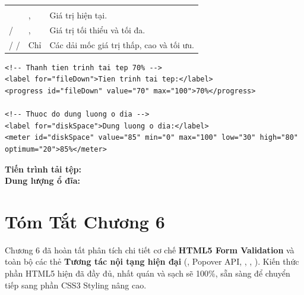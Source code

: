 \begin{prettyTableBox}
\begin{tabularx}{\linewidth}{K{3.0cm} Z Z}
 &  &  \\
 & ,  & Giá trị hiện tại. \\
 /  & ,  & Giá trị tối thiểu và tối đa. \\
 /  /  & Chỉ  & Các dải mốc giá trị thấp, cao và tối ưu. \\
\end{tabularx}
\end{prettyTableBox}

\begin{codeWindow}
\begin{lstlisting}[language=HTML5]
<!-- Thanh tien trinh tai tep 70% -->
<label for="fileDown">Tien trinh tai tep:</label>
<progress id="fileDown" value="70" max="100">70%</progress>

<!-- Thuoc do dung luong o dia -->
<label for="diskSpace">Dung luong o dia:</label>
<meter id="diskSpace" value="85" min="0" max="100" low="30" high="80" optimum="20">85%</meter>
\end{lstlisting}
\end{codeWindow}

\begin{browserWindow}
\sffamily\small
\textbf{Tiến trình tải tệp:} \;\;
 \\[6pt]
\textbf{Dung lượng ổ đĩa:} \;\;
\end{browserWindow}

\section{Tóm Tắt Chương 6}
Chương 6 đã hoàn tất phân tích chi tiết cơ chế \textbf{HTML5 Form Validation} và toàn bộ các thẻ \textbf{Tương tác nội tạng hiện đại} (, Popover API, , , ). Kiến thức phần HTML5 hiện đã đầy đủ, nhất quán và sạch sẽ 100\%, sẵn sàng để chuyển tiếp sang phần CSS3 Styling nâng cao.


